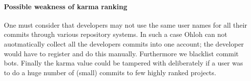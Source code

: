 \paragraph{Possible weakness of karma ranking}
One must consider that developers may not use the same user names for all their commits through various repository systems. In such a case Ohloh can not auotmatically collect all the developers commits into one account; the developer would have to register and do this manually. Furthermore we blacklist commit bots. Finally the karma value could be tampered with deliberately if a user was to do a huge number of (small) commits to few highly ranked projects.

%
%
%
%

